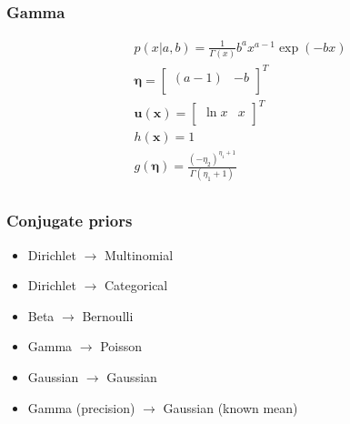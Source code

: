 \subsubsection{Gamma}
\begin{fleqn}[\parindent]
	\begin{equation*}
	\begin{split}
	& p(x|a,b) = \frac{1}{\Gamma(x)}b^{a}x^{a-1}\exp(-bx)\\[8pt]
	& \bm{\eta} = \begin{bmatrix}
	(a-1) & -b \\
	\end{bmatrix}^T\\
	& \bm{u}(\bm{x}) = \begin{bmatrix}
	\ln x & x\\
	\end{bmatrix}^T\\
	& h(\bm{x}) = 1\\
	& g(\bm{\eta}) = \frac{(-\eta_2)^{\eta_1+1}}{\Gamma(\eta_1+1)}\\
	\end{split}
	\end{equation*}
\end{fleqn}
\subsubsection{Conjugate priors}
\begin{itemize}
	\item Dirichlet $\to$ Multinomial 
	\item Dirichlet $\to$ Categorical 
	\item Beta $\to$ Bernoulli
	\item Gamma $\to$ Poisson
	\item Gaussian $\to$ Gaussian
	\item Gamma (precision) $\to$ Gaussian (known mean)
\end{itemize}